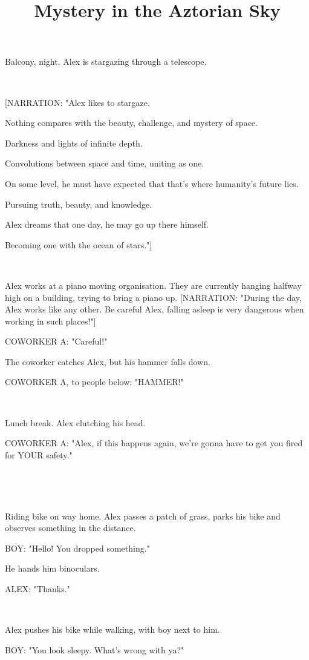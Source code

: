 \documentclass[11pt]{article}
\begin{document}
\ttfamily
\title{Mystery in the Aztorian Sky}
\maketitle

Balcony, night.
Alex is stargazing through a telescope.

\ 

[NARRATION: "Alex likes to stargaze.

Nothing compares with the beauty, challenge, and mystery of space.

Darkness and lights of infinite depth.

Convolutions between space and time, uniting as one.

On some level, he must have expected that that's where humanity's future lies.

Pursuing truth, beauty, and knowledge.

Alex dreams that one day, he may go up there himself.

Becoming one with the ocean of stars."]

\ 

Alex works at a piano moving organisation.
They are currently hanging halfway high on a building, trying to bring a piano up.
[NARRATION: "During the day, Alex works like any other.
Be careful Alex, falling asleep is very dangerous when working in such places!"]

COWORKER A: "Careful!"

The coworker catches Alex, but his hammer falls down.

COWORKER A, to people below: "HAMMER!"

\ 

Lunch break. 
Alex clutching his head.

COWORKER A: "Alex, if this happens again, we're gonna have to get you fired for YOUR safety."

\ 

\ 

Riding bike on way home.
Alex passes a patch of grass, parks his bike and observes something in the distance. 

BOY: "Hello!
You dropped something."

He hands him binoculars.

ALEX: "Thanks."

\ 

Alex pushes his bike while walking, with boy next to him. 

BOY: "You look sleepy. 
What's wrong with ya?"
\end{document}

